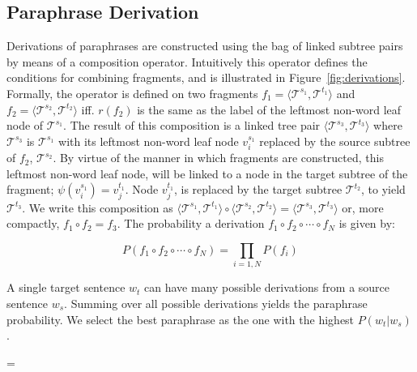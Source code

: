 \subsection{Paraphrase Derivation}

Derivations of paraphrases are constructed using the bag of linked subtree pairs by means of a composition operator.
Intuitively this operator defines the conditions for combining fragments, and is illustrated in
Figure~\ref{fig:derivations}. Formally, the operator is defined on two fragments $f_1 = \langle \mathscr{T}^{s_1},
\mathscr{T}^{t_1} \rangle$ and  $f_2 = \langle \mathscr{T}^{s_2}, \mathscr{T}^{t_2} \rangle$ iff. 
$r(f_2)$ is the same as the label of the leftmost non-word leaf node of $\mathscr{T}^{s_1}$. The result of this
composition is a linked tree pair $\langle \mathscr{T}^{s_3}, \mathscr{T}^{t_3} \rangle$ where $\mathscr{T}^{s_3}$ is
$\mathscr{T}^{s_1}$ with its leftmost non-word leaf node $v_{i}^{s_1}$ replaced by the source subtree of $f_2$,
$\mathscr{T}^{s_2}$.  By virtue of the manner in which fragments are constructed, this leftmost non-word leaf node,
will be linked to a node in the target subtree of the fragment; $\psi(v^{s_1}_i) = v^{t_1}_j$. Node $v^{t_1}_j$, is
replaced by the target subtree $\mathscr{T}^{t_2}$, to yield $\mathscr{T}^{t_3}$. We write this composition as
$\langle \mathscr{T}^{s_1}, \mathscr{T}^{t_1} \rangle \circ \langle \mathscr{T}^{s_2}, \mathscr{T}^{t_2} \rangle = \langle \mathscr{T}^{s_3}, \mathscr{T}^{t_3} \rangle$ 
or, more compactly, $f_1 \circ f_2 = f_3$. The probability a derivation $f_1 \circ f_2 \circ \cdots \circ f_N$ is given by:

\begin{equation}
P( f_1 \circ f_2 \circ \cdots \circ f_N ) = \prod_{i=1,N} P(f_i)
\end{equation}

A single target sentence $w_t$ can have many possible derivations from a source sentence
$w_s$. Summing over all possible derivations yields the paraphrase probability. We select the best
paraphrase as the one with the highest $P(w_t \vert w_s)$.

\begin{figure*}[t] 
\begin{center}
\epsfxsize=\textwidth
\mbox{}
\end{center}
\caption{One derivation of the paraphrase ``{\em I enjoy tennis}'' from ``{\em I like tennis}''.}
\label{fig:derivations}
\end{figure*}

